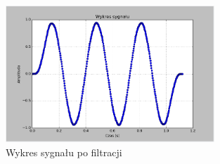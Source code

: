 \documentclass{article}
\begin{document}
{{            \begin{figure}[h!]
                \centering
                \includegraphics[width=0.7\textwidth]{img/fil8.png}
                \caption{Wykres sygnału po filtracji}
            \end{figure}
            \FloatBarrier
        }
        \newpage

}
\end{document}
